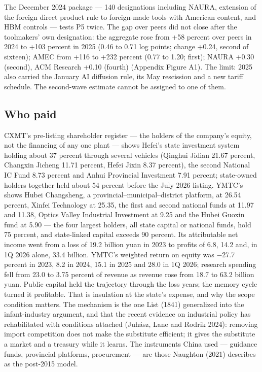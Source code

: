 \documentclass[12pt]{article}
\begin{document}
The December 2024 package --- 140 designations including NAURA, extension of the foreign direct product rule to foreign-made tools with American content, and HBM controls --- tests P5 twice. The gap over peers did not close after the toolmakers' own designation: the aggregate rose from +58 percent over peers in 2024 to +103 percent in 2025 (0.46 to 0.71 log points; change +0.24, second of sixteen); AMEC from +116 to +232 percent (0.77 to 1.20; first); NAURA +0.30 (second), ACM Research +0.10 (fourth) (Appendix Figure A1). The limit: 2025 also carried the January AI diffusion rule, its May rescission and a new tariff schedule. The second-wave estimate cannot be assigned to one of them.

\subsection{Who paid}

CXMT's pre-listing shareholder register --- the holders of the company's equity, not the financing of any one plant --- shows Hefei's state investment system holding about 37 percent through several vehicles (Qinghui Jidian 21.67 percent, Changxin Jicheng 11.71 percent, Hefei Jixin 8.37 percent), the second National IC Fund 8.73 percent and Anhui Provincial Investment 7.91 percent; state-owned holders together held about 54 percent before the July 2026 listing. YMTC's shows Hubei Changsheng, a provincial--municipal--district platform, at 26.54 percent, Xinfei Technology at 25.35, the first and second national funds at 11.97 and 11.38, Optics Valley Industrial Investment at 9.25 and the Hubei Guoxin fund at 5.90 --- the four largest holders, all state capital or national funds, hold 75 percent, and state-linked capital exceeds 90 percent. Its attributable net income went from a loss of 19.2 billion yuan in 2023 to profits of 6.8, 14.2 and, in 1Q 2026 alone, 33.4 billion. YMTC's weighted return on equity was −27.7 percent in 2023, 8.2 in 2024, 15.1 in 2025 and 28.0 in 1Q 2026; research spending fell from 23.0 to 3.75 percent of revenue as revenue rose from 18.7 to 63.2 billion yuan. Public capital held the trajectory through the loss years; the memory cycle turned it profitable. That is insulation at the state's expense, and why the scope condition matters. The mechanism is the one List (1841) generalized into the infant-industry argument, and that the recent evidence on industrial policy has rehabilitated with conditions attached (Juhász, Lane and Rodrik 2024): removing import competition does not make the substitute efficient; it gives the substitute a market and a treasury while it learns. The instruments China used --- guidance funds, provincial platforms, procurement --- are those Naughton (2021) describes as the post-2015 model.
\end{document}

